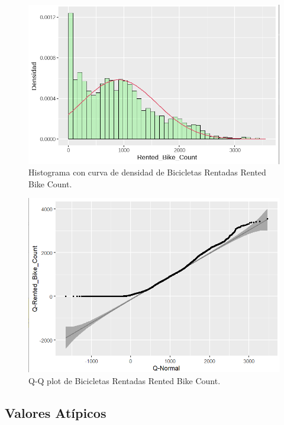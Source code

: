 \documentclass[]{elsarticle} %
\begin{document}
\begin{figure}[H]

{\centering \includegraphics[width=1\linewidth]{frec_density} 

}

\caption{\label{fig:fig3}Histograma con curva de densidad de Bicicletas Rentadas Rented Bike Count.}\label{fig:fig3}
\end{figure}
\begin{figure}[H]

{\centering \includegraphics[width=1\linewidth]{qq} 

}

\caption{\label{fig:fig4}Q-Q plot de Bicicletas Rentadas Rented Bike Count.}\label{fig:fig4}
\end{figure}

\newpage
\subsection{Valores Atípicos}
\end{document}
